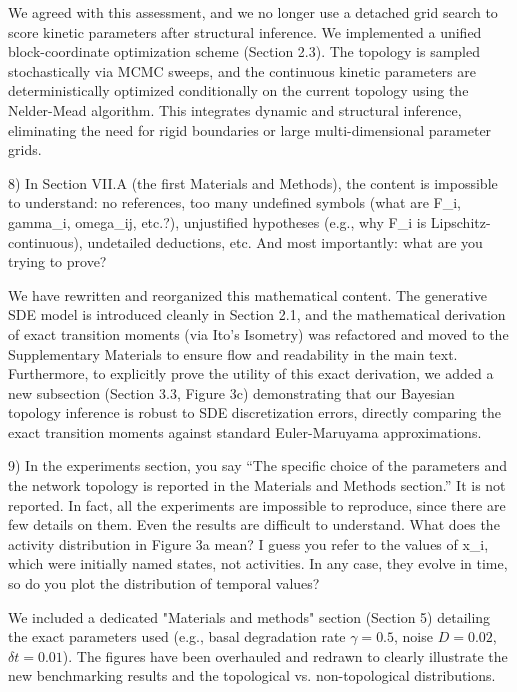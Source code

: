 \documentclass[11pt,a4paper]{article}
\begin{document}
We agreed with this assessment, and we no longer use a detached grid search to score kinetic parameters after structural inference. We implemented a unified block-coordinate optimization scheme (Section 2.3). The topology is sampled stochastically via MCMC sweeps, and the continuous kinetic parameters are deterministically optimized conditionally on the current topology using the Nelder-Mead algorithm. This integrates dynamic and structural inference, eliminating the need for rigid boundaries or large multi-dimensional parameter grids.

\begin{reviewercomment}
8) In Section VII.A (the first Materials and Methods), the content is impossible to understand: no references, too many undefined symbols (what are F\_i, gamma\_i, omega\_ij, etc.?), unjustified hypotheses (e.g., why F\_i is Lipschitz-continuous), undetailed deductions, etc. And most importantly: what are you trying to prove?
\end{reviewercomment}

We have rewritten and reorganized this mathematical content. The generative SDE model is introduced cleanly in Section 2.1, and the mathematical derivation of exact transition moments (via Ito's Isometry) was refactored and moved to the Supplementary Materials to ensure flow and readability in the main text. Furthermore, to explicitly prove the utility of this exact derivation, we added a new subsection (Section 3.3, Figure 3c) demonstrating that our Bayesian topology inference is robust to SDE discretization errors, directly comparing the exact transition moments against standard Euler-Maruyama approximations.

\begin{reviewercomment}
9) In the experiments section, you say “The specific choice of the parameters and the network topology is reported in the Materials and Methods section.” It is not reported. In fact, all the experiments are impossible to reproduce, since there are few details on them. Even the results are difficult to understand. What does the activity distribution in Figure 3a mean? I guess you refer to the values of x\_i, which were initially named states, not activities. In any case, they evolve in time, so do you plot the distribution of temporal values?
\end{reviewercomment}

We included a dedicated "Materials and methods" section (Section 5) detailing the exact parameters used (e.g., basal degradation rate $\gamma = 0.5$, noise $D = 0.02$, $\delta t = 0.01$). The figures have been overhauled and redrawn to clearly illustrate the new benchmarking results and the topological vs. non-topological distributions. 
\end{document}
